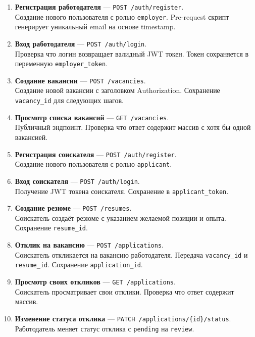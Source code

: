 ﻿\documentclass[a4paper,14pt]{extarticle}
\begin{document}
\begin{enumerate}[leftmargin=2cm]
  \item \textbf{Регистрация работодателя} — \texttt{POST /auth/register}.\\
    Создание нового пользователя с ролью \texttt{employer}. Pre-request скрипт генерирует уникальный email на основе timestamp.

  \item \textbf{Вход работодателя} — \texttt{POST /auth/login}.\\
    Проверка что логин возвращает валидный JWT токен. Токен сохраняется в переменную \texttt{employer\_token}.

  \item \textbf{Создание вакансии} — \texttt{POST /vacancies}.\\
    Создание новой вакансии с заголовком Authorization. Сохранение \texttt{vacancy\_id} для следующих шагов.

  \item \textbf{Просмотр списка вакансий} — \texttt{GET /vacancies}.\\
    Публичный эндпоинт. Проверка что ответ содержит массив с хотя бы одной вакансией.

  \item \textbf{Регистрация соискателя} — \texttt{POST /auth/register}.\\
    Создание нового пользователя с ролью \texttt{applicant}.

  \item \textbf{Вход соискателя} — \texttt{POST /auth/login}.\\
    Получение JWT токена соискателя. Сохранение в \texttt{applicant\_token}.

  \item \textbf{Создание резюме} — \texttt{POST /resumes}.\\
    Соискатель создаёт резюме с указанием желаемой позиции и опыта. Сохранение \texttt{resume\_id}.

  \item \textbf{Отклик на вакансию} — \texttt{POST /applications}.\\
    Соискатель откликается на вакансию работодателя. Передача \texttt{vacancy\_id} и \texttt{resume\_id}. Сохранение \texttt{application\_id}.

  \item \textbf{Просмотр своих откликов} — \texttt{GET /applications}.\\
    Соискатель просматривает свои отклики. Проверка что ответ содержит массив.

  \item \textbf{Изменение статуса отклика} — \texttt{PATCH /applications/\{id\}/status}.\\
    Работодатель меняет статус отклика с \texttt{pending} на \texttt{review}.
\end{enumerate}
\end{document}
